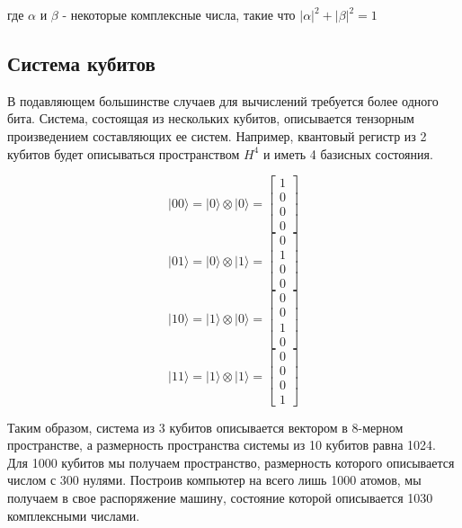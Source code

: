 \documentclass[14pt]{article}
\begin{document}
	где $\alpha$ и $\beta$ - некоторые комплексные числа, такие что $|\alpha|^2 + |\beta|^2 = 1$
	
	\newpage
	\subsection{Система кубитов}	
	
	В подавляющем большинстве случаев для вычислений требуется более одного бита. Система, состоящая из нескольких кубитов, описывается тензорным произведением составляющих ее систем. Например, квантовый регистр из 2 кубитов будет описываться пространством $H^4$ и иметь 4 базисных состояния.
	
	\begin{equation}
	|00 \rangle = |0 \rangle \otimes |0 \rangle = \begin{bmatrix} 1 \\ 0 \\ 0 \\ 0 \end{bmatrix}
	\end{equation}
	\begin{equation}
	|01 \rangle = |0 \rangle \otimes |1 \rangle = \begin{bmatrix} 0 \\ 1 \\ 0 \\ 0 \end{bmatrix}
	\end{equation}
	\begin{equation}
	|10 \rangle = |1 \rangle \otimes |0 \rangle = \begin{bmatrix} 0 \\ 0 \\ 1 \\ 0 \end{bmatrix}
	\end{equation}
	\begin{equation}
	|11 \rangle = |1 \rangle \otimes |1 \rangle = \begin{bmatrix} 0 \\ 0 \\ 0 \\ 1 \end{bmatrix}
	\end{equation}
	
	Таким образом, система из 3 кубитов описывается вектором в 8-мерном пространстве, а размерность пространства системы из 10 кубитов равна 1024. Для 1000 кубитов мы получаем пространство, размерность которого описывается числом с 300 нулями.
Построив компьютер на всего лишь 1000 атомов, мы получаем в свое распоряжение машину, состояние которой описывается 1030 комплексными числами.
	
\end{document}
